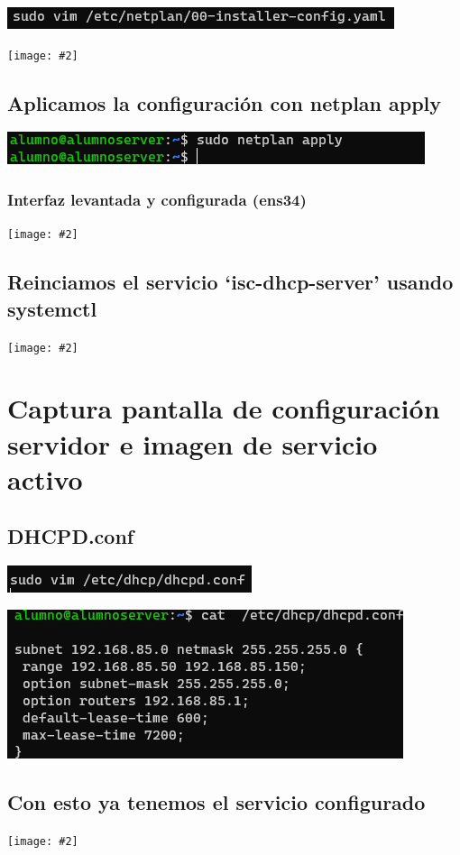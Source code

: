 \documentclass[a4paper,12pt]{article} %
\newcommand{\image}[2][1]{\texttt{[image: \#2]}}
\begin{document}
\includegraphics{09.png}

\image{08.png}

\subsection{Aplicamos la configuración con netplan apply}

\includegraphics{10.png}
\subsubsection{Interfaz levantada y configurada (ens34)}
\image{11.png}

\subsection{Reinciamos el servicio `isc-dhcp-server' usando systemctl}
\image{13.png}


\section{Captura pantalla de configuración servidor e imagen de servicio activo}
\subsection{DHCPD.conf}

\includegraphics{06.png}

\includegraphics{05.png}
\subsection{Con esto ya tenemos el servicio configurado}
\image{12.png}
\end{document}
